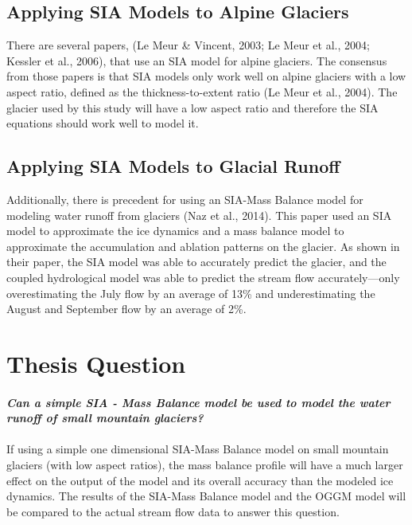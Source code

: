 \documentclass{article}
\begin{document}
\subsection{Applying SIA Models to Alpine Glaciers}
    There are several papers, (Le Meur \& Vincent, 2003; Le Meur et al., 2004; Kessler et al., 2006), that use an SIA model for alpine glaciers. The consensus 
from those papers is that SIA models only work well on alpine glaciers with a low aspect ratio, defined as the thickness-to-extent ratio 
(Le Meur et al., 2004). The glacier used by this study will have a low aspect ratio and therefore the SIA equations should work well to model it.
\subsection{Applying SIA Models to Glacial Runoff}
    Additionally, there is precedent for using an SIA-Mass Balance model for modeling water runoff from glaciers (Naz et al., 2014). This paper used 
an SIA model to approximate the ice dynamics and a mass balance model to approximate the accumulation and ablation patterns on the glacier. 
As shown in their paper, the SIA model was able to accurately predict the glacier, and the coupled hydrological model was able to predict 
the stream flow accurately---only overestimating the July flow by an average of 13\% and underestimating the August and September flow by an 
average of 2\%.

\section{Thesis Question}
\paragraph{}
\noindent\textit{\textbf{Can a simple SIA - Mass Balance model be used to model the water runoff of small mountain glaciers?}}
\paragraph{}
If using a simple one dimensional SIA-Mass Balance model on small mountain glaciers (with low aspect ratios), the mass balance profile will have a 
much larger effect on the output of the model and its overall accuracy than the modeled ice dynamics. The results of the SIA-Mass Balance 
model and the OGGM model will be compared to the actual stream flow data to answer this question.
\end{document}
